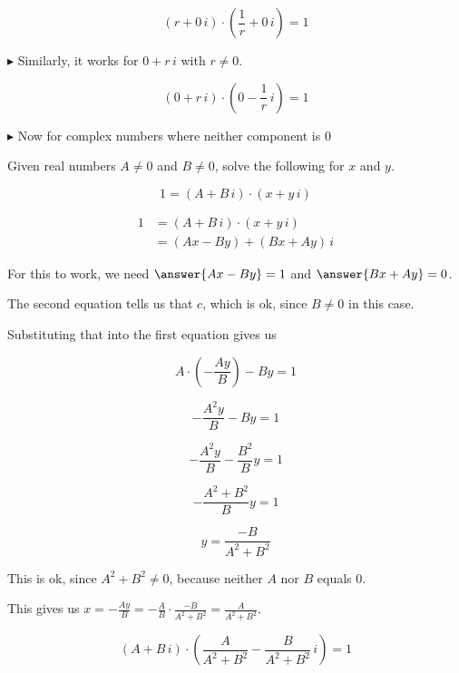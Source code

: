 \documentclass{ximera}
\begin{document}
\[   (r + 0 \, i) \cdot \left(\frac{1}{r} + 0 \, i \right) = 1        \]







$\blacktriangleright$  Similarly, it works for $0 + r \, i$ with $r \ne 0$.


\[   (0 + r \, i) \cdot \left(0 - \frac{1}{r} \, i \right) = 1        \]





$\blacktriangleright$ Now for complex numbers where neither component is $0$


\begin{explanation}


Given real numbers $A \ne 0$ and $B \ne 0$, solve the following for $x$ and $y$.


\[       1 = (A + B \, i) \cdot (x + y \, i)            \]



\begin{align*}
1          & = (A + B \, i) \cdot (x + y \, i)      \\
           & = (Ax-By) + (Bx+Ay) \, i
\end{align*}


For this to work, we need $\answer{A x - B y} = 1$ and $\answer{B x + A y} = 0$.



The second equation tells us that $c$, which is ok, since $B \ne 0$ in this case.

Substituting that into the first equation gives us


\[   A \cdot \left(-\frac{A y}{B}\right) - B y = 1     \]


\[   -\frac{A^2 y}{B} - B y = 1     \]

\[   -\frac{A^2 y}{B} - \frac{B^2}{B} y = 1     \]


\[   -\frac{A^2 + B^2}{B} y = 1     \]


\[  y = \frac{-B}{A^2 + B^2}     \]

This is ok, since $A^2 + B^2 \ne 0$, because neither $A$ nor $B$ equals $0$.



This gives us $x = -\frac{A y}{B} = -\frac{A}{B} \cdot \frac{-B}{A^2 + B^2} = \frac{A}{A^2 + B^2} $.







\[       (A + B \, i) \cdot \left( \frac{A}{A^2 + B^2} - \frac{B}{A^2 + B^2} \, i \right) = 1            \]



\end{explanation}
\end{document}
